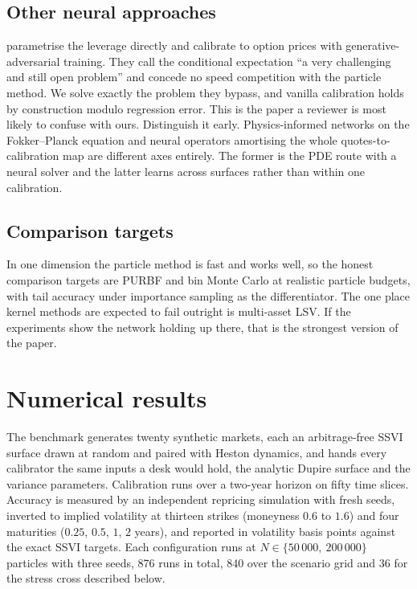\documentclass[11pt,a4paper]{article}
\theoremstyle{plain}
\theoremstyle{definition}
\theoremstyle{definition}
\begin{document}
\subsection{Other neural approaches}

\citet{cuchiero2020} parametrise the leverage directly and calibrate to option prices with generative-adversarial training. They call the conditional expectation ``a very challenging and still open problem'' and concede no speed competition with the particle method. We solve exactly the problem they bypass, and vanilla calibration holds by construction modulo regression error. This is the paper a reviewer is most likely to confuse with ours. Distinguish it early. Physics-informed networks on the Fokker--Planck equation \citep{hoshisashi2025} and neural operators amortising the whole quotes-to-calibration map \citep{wang2026} are different axes entirely. The former is the PDE route with a neural solver and the latter learns across surfaces rather than within one calibration.

\subsection{Comparison targets}

In one dimension the particle method is fast and works well, so the honest comparison targets are PURBF and bin Monte Carlo at realistic particle budgets, with tail accuracy under importance sampling as the differentiator. The one place kernel methods are expected to fail outright is multi-asset LSV. If the experiments show the network holding up there, that is the strongest version of the paper.


\section{Numerical results}\label{sec:results}

The benchmark generates twenty synthetic markets, each an arbitrage-free SSVI surface drawn at random and paired with Heston dynamics, and hands every calibrator the same inputs a desk would hold, the analytic Dupire surface and the variance parameters. Calibration runs over a two-year horizon on fifty time slices. Accuracy is measured by an independent repricing simulation with fresh seeds, inverted to implied volatility at thirteen strikes (moneyness $0.6$ to $1.6$) and four maturities ($0.25$, $0.5$, $1$, $2$ years), and reported in volatility basis points against the exact SSVI targets. Each configuration runs at $N \in \{50\,000,\ 200\,000\}$ particles with three seeds, 876 runs in total, 840 over the scenario grid and 36 for the stress cross described below.
\end{document}
